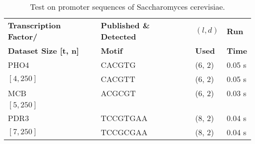 \begin{table}[h] %
	\renewcommand{\arraystretch}{1.3}
	\centering
	\begin{tabular}{|l|l|l|l|}
	\hline 
	\bfseries Transcription Factor/ &
	\bfseries Published \& Detected & 
	\bfseries $(l, d)$ & 
	\bfseries Run\\

	\bfseries Dataset Size [t, n] &
	\bfseries Motif & 
	\bfseries Used &
	\bfseries Time\\

	\hline
	 PHO4 			& CACGTG  & (6, 2) & 0.05 s \\ 
	 $[4, 250]$ 	& CACGTT  & (6, 2) & 0.05 s \\ 

	 MCB 			& ACGCGT  	& (6, 2) 	& 0.03 s \\ 
	 $[5, 250]$ 	&  			&  			&  		  \\ 

	 PDR3 			& TCCGTGAA  & (8, 2) & 0.04 s \\ 
	 $[7, 250]$		& TCCGCGAA  & (8, 2) & 0.04 s \\ 


	\hline\end{tabular}
	\caption{Test on promoter sequences of Saccharomyces cerevisiae.}
	\label{tbl:yeast}
\end{table}